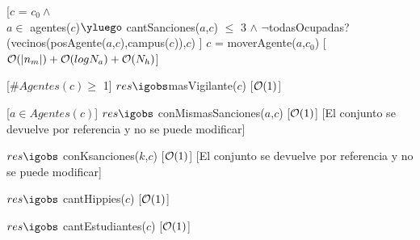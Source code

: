 \begin{Interfaz}
	[$c$ = $c_0 \land$\\
	$a \in$ agentes($c$)$\yluego$ cantSanciones($a$,$c$) $\leq$ 3 $\land$ $\neg$todasOcupadas?(vecinos(posAgente($a$,$c$),campus($c$)),$c$) ]
	{$c$ = moverAgente($a$,$c_0$)}
	[$\mathcal{O}(|n_m|) + \mathcal{O}(log N_a) + \mathcal{O}(N_h)$]
	
	[$\#Agentes(c) \geq$ 1]
	{$res \igobs$masVigilante($c$)}
	[$\mathcal{O}(1)$]

	[$a \in Agentes(c)$]
	{$res \igobs$ conMismasSanciones($a$,$c$)}
	[$\mathcal{O}(1)$]
	[El conjunto se devuelve por referencia y no se puede modificar]	
	
	{$res \igobs$ conKsanciones($k$,$c$)}
	[$\mathcal{O}(1)$]
	[El conjunto se devuelve por referencia y no se puede modificar]
		
	{$res \igobs$ cantHippies($c$)}
	[$\mathcal{O}(1)$]

	{$res \igobs$ cantEstudiantes($c$)}
	[$\mathcal{O}(1)$]	
	
\end{Interfaz}

